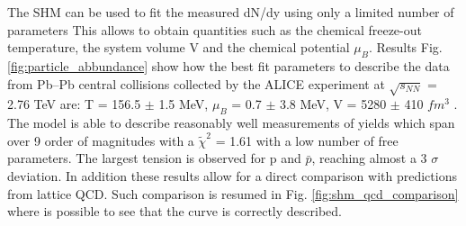 \documentclass[12pt,a4paper]{book}
\begin{document}
	
	The SHM can be used to fit the measured dN/dy using only a limited number of parameters This allows to obtain quantities such as the chemical freeze-out temperature, the system volume V and the chemical potential $\mu_B$. Results Fig. \ref{fig:particle_abbundance} show how the best fit parameters to describe the data from Pb–Pb central collisions collected by the ALICE experiment at $\sqrt{s_{NN}}$ = 2.76 TeV are: T = 156.5 $\pm$ 1.5 MeV, $\mu_B$ = 0.7 $\pm$ 3.8 MeV, V = 5280 $\pm$ 410 $fm^3$ . The model is able to describe reasonably well measurements of yields which span over 9 order of magnitudes with a $\tilde{\chi}^2$ = 1.61 with a low number of free parameters. The largest tension is observed for p and $\bar{p}$, reaching almost a 3 $\sigma$ deviation. \cite{Andronic_2017} In addition these results allow for a direct comparison with predictions from lattice QCD. Such comparison is resumed in Fig. \ref{fig:shm_qcd_comparison} where is possible to see that the curve is correctly described.
	
\end{document}
